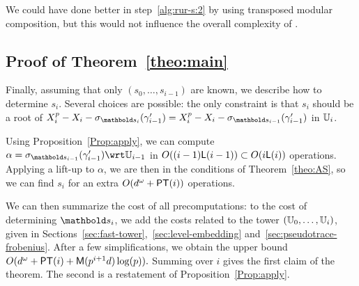 \begin{nota}
  We could have done better in step~\ref{alg:rur-s:2} by using
  transposed modular composition, but this would not influence the
  overall complexity of .
\end{nota}


\subsection[Proof of the theorem]{Proof of Theorem~\ref{theo:main}}

Finally, assuming that only $(s_0,\dots,s_{i-1})$ are known, we
describe how to determine $s_i$. Several choices are possible: the
only constraint is that $s_i$ should be a root of
$X_i^p-X_i-\sigma_{\lst{s}_i}(\gamma'_{i-1})=X_i^p-X_i-\sigma_{\lst{s}_{i-1}}(\gamma'_{i-1})$
in $\mathbb{U}_i$.

Using Proposition~\ref{Prop:apply}, we can compute
$\alpha=\sigma_{\lst{s}_{i-1}}(\gamma'_{i-1}) \wrt\U_{i-1}$ in
$O((i-1)\mathsf{L}(i-1)) \subset O(i\mathsf{L}(i))$ operations.  Applying a
lift-up to $\alpha$, we are then in the conditions of
Theorem~\ref{theo:AS}, so we can find $s_i$ for an extra $O(d^\omega +
\mathsf{PT}(i))$ operations.

We can then summarize the cost of all precomputations: to the cost of
determining $\lst{s}_i$, we add the costs related to the tower
$(\mathbb{U}_0,\dots,\mathbb{U}_i)$, given in
Sections~\ref{sec:fast-tower},~\ref{sec:level-embedding}
and~\ref{sec:pseudotrace-frobenius}. After a few simplifications, we
obtain the upper bound $O( d^\omega + \mathsf{PT}(i) + \mathsf{M}(p^{i+1} d)
\log(p)).$ Summing over $i$ gives the first claim of the theorem. The
second is a restatement of Proposition~\ref{Prop:apply}.

%
